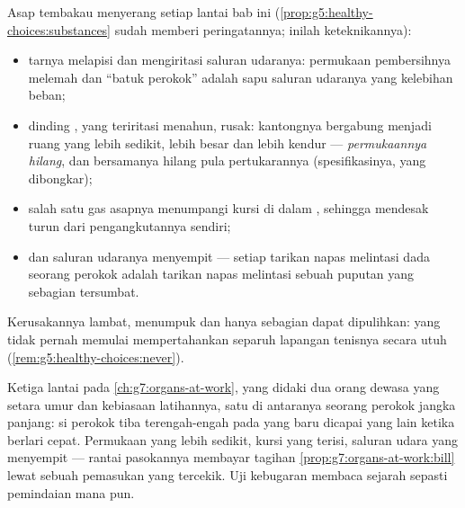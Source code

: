 \begin{proposition}\label{prop:g7:lungs-and-gas-exchange:smoke}
Asap tembakau menyerang setiap lantai bab ini
(\cref{prop:g5:healthy-choices:substances} sudah memberi
peringatannya; inilah keteknikannya):
\begin{itemize}
  \item tarnya melapisi dan mengiritasi saluran udaranya: permukaan
        pembersihnya melemah dan ``batuk perokok'' adalah sapu
        saluran udaranya yang kelebihan beban;
  \item dinding , yang teriritasi menahun, rusak:
        kantongnya bergabung menjadi ruang yang lebih sedikit, lebih
        besar dan lebih kendur --- \emph{permukaannya hilang}, dan
        bersamanya hilang pula pertukarannya (spesifikasinya, yang
        dibongkar);
  \item salah satu gas asapnya menumpangi kursi  di dalam
        , sehingga mendesak  turun dari
        pengangkutannya sendiri;
  \item dan saluran udaranya menyempit --- setiap tarikan napas
        melintasi dada seorang perokok adalah tarikan napas melintasi
        sebuah puputan yang sebagian tersumbat.
\end{itemize}
Kerusakannya lambat, menumpuk dan hanya sebagian dapat dipulihkan:
 yang tidak pernah memulai mempertahankan separuh lapangan
tenisnya secara utuh (\cref{rem:g5:healthy-choices:never}).
\end{proposition}
\admitted

\begin{example}\label{ex:g7:lungs-and-gas-exchange:stairs}
Ketiga lantai pada \cref{ch:g7:organs-at-work}, yang didaki dua orang
dewasa yang setara umur dan kebiasaan latihannya, satu di antaranya
seorang perokok jangka panjang: si perokok tiba terengah-engah pada
 yang baru dicapai yang lain ketika berlari cepat.
Permukaan yang lebih sedikit, kursi yang terisi, saluran udara yang
menyempit --- rantai pasokannya membayar tagihan
\cref{prop:g7:organs-at-work:bill} lewat sebuah pemasukan yang
tercekik. Uji kebugaran membaca sejarah  sepasti pemindaian
mana pun.
\end{example}

